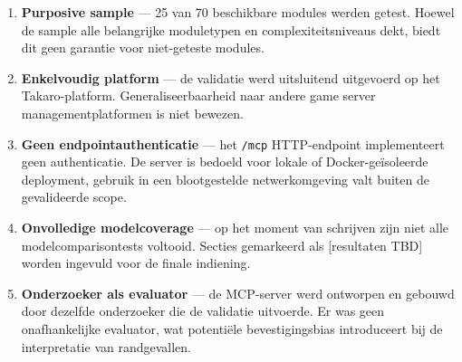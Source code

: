 \begin{enumerate}
    \item \textbf{Purposive sample} — 25 van 70 beschikbare modules werden getest. Hoewel de sample alle belangrijke moduletypen en complexiteitsniveaus dekt, biedt dit geen garantie voor niet-geteste modules.
    \item \textbf{Enkelvoudig platform} — de validatie werd uitsluitend uitgevoerd op het Takaro-platform. Generaliseerbaarheid naar andere game server managementplatformen is niet bewezen.
    \item \textbf{Geen endpointauthenticatie} — het \texttt{/mcp} HTTP-endpoint implementeert geen authenticatie. De server is bedoeld voor lokale of Docker-geïsoleerde deployment, gebruik in een blootgestelde netwerkomgeving valt buiten de gevalideerde scope.
    \item \textbf{Onvolledige modelcoverage} — op het moment van schrijven zijn niet alle modelcomparisontests voltooid. Secties gemarkeerd als [resultaten TBD] worden ingevuld voor de finale indiening.
    \item \textbf{Onderzoeker als evaluator} — de MCP-server werd ontworpen en gebouwd door dezelfde onderzoeker die de validatie uitvoerde. Er was geen onafhankelijke evaluator, wat potentiële bevestigingsbias introduceert bij de interpretatie van randgevallen.
\end{enumerate}


